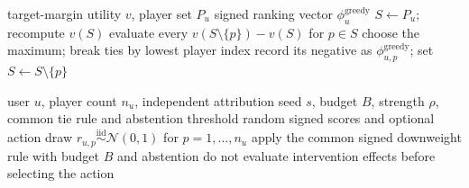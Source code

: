 \documentclass[a4paper,fleqn,doubleblind]{cas-sc}
\begin{document}
\begin{algorithm}[t]
\caption{Greedy sequential-deletion baseline}
\label{alg:greedy-baseline}
\begin{algorithmic}[1]
\Require target-margin utility $v$, player set $P_u$
\Ensure signed ranking vector $\phi^{\mathrm{greedy}}_u$
\State $S\gets P_u$; recompute $v(S)$
  \State evaluate every $v(S\setminus\{p\})-v(S)$ for $p\in S$
  \State choose the maximum; break ties by lowest player index
  \State record its negative as $\phi^{\mathrm{greedy}}_{u,p}$; set $S\gets S\setminus\{p\}$
\EndWhile
\end{algorithmic}
\end{algorithm}

\begin{algorithm}[t]
\caption{Random attribution negative control}
\label{alg:random-baseline}
\begin{algorithmic}[1]
\Require user $u$, player count $n_u$, independent attribution seed $s$, budget $B$, strength $\rho$, common tie rule and abstention threshold
\Ensure random signed scores and optional action
\State draw $r_{u,p}\overset{\mathrm{iid}}{\sim}\mathcal{N}(0,1)$ for $p=1,\ldots,n_u$
\State apply the common signed downweight rule with budget $B$ and abstention
\State do not evaluate intervention effects before selecting the action
\end{algorithmic}
\end{algorithm}
\end{document}
